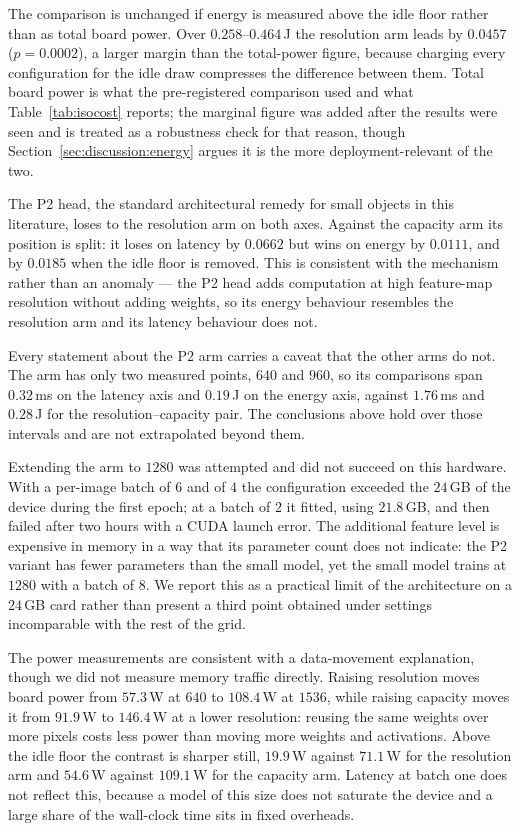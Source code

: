 The comparison is unchanged if energy is measured above the idle floor rather than as total
board power. Over $0.258$--$0.464$\,J the resolution arm leads by $0.0457$
($p = 0.0002$), a larger margin than the total-power figure, because charging every
configuration for the idle draw compresses the difference between them. Total board power is what the pre-registered comparison used and what
Table~\ref{tab:isocost} reports; the marginal figure was added after the results were seen
and is treated as a robustness check for that reason, though
Section~\ref{sec:discussion:energy} argues it is the more deployment-relevant of the two.

The P2 head, the standard architectural remedy for small objects in this literature, loses
to the resolution arm on both axes. Against the capacity arm its position is split: it
loses on latency by $0.0662$ but wins on energy by $0.0111$, and by $0.0185$ when the idle
floor is removed. This is consistent with the mechanism rather than an anomaly --- the P2
head adds computation at high feature-map resolution without adding weights, so its energy
behaviour resembles the resolution arm and its latency behaviour does not.

Every statement about the P2 arm carries a caveat that the other arms do not. The arm has
only two measured points, $640$ and $960$, so its comparisons span $0.32$\,ms on the
latency axis and $0.19$\,J on the energy axis, against $1.76$\,ms and $0.28$\,J for the
resolution--capacity pair. The conclusions above hold over those intervals and are not
extrapolated beyond them.

Extending the arm to $1280$ was attempted and did not succeed on this hardware. With a
per-image batch of $6$ and of $4$ the configuration exceeded the $24$\,GB of the device
during the first epoch; at a batch of $2$ it fitted, using $21.8$\,GB, and then failed
after two hours with a CUDA launch error. The additional feature level is expensive in
memory in a way that its parameter count does not indicate: the P2 variant has fewer
parameters than the small model, yet the small model trains at $1280$ with a batch of $8$.
We report this as a practical limit of the architecture on a $24$\,GB card rather than
present a third point obtained under settings incomparable with the rest of the grid.

The power measurements are consistent with a data-movement explanation, though we did not measure memory traffic directly. Raising resolution moves board power
from $57.3$\,W at $640$ to $108.4$\,W at $1536$, while raising capacity moves it from
$91.9$\,W to $146.4$\,W at a lower resolution: reusing the same weights over more pixels
costs less power than moving more weights and activations. Above the idle floor the
contrast is sharper still, $19.9$\,W against $71.1$\,W for the resolution arm and
$54.6$\,W against $109.1$\,W for the capacity arm. Latency at batch one does not reflect
this, because a model of this size does not saturate the device and a large share of the
wall-clock time sits in fixed overheads.


